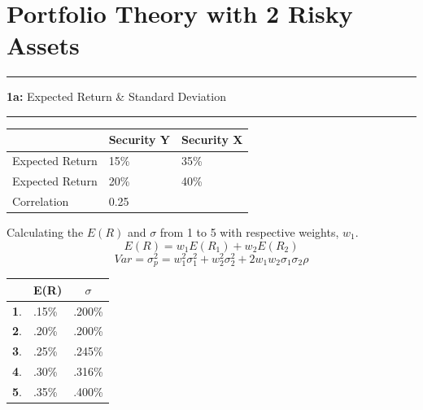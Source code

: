 \documentclass[11pt]{article}
\newcommand\question[2]{\vspace{.25in}\hrule\textbf{#1: } #2\vspace{.5em}\hrule\vspace{.10in}}
\begin{document}
\raggedright
\newcommand\NAME{Ramel Tranquille}  %
\newcommand\ANDREWID{rt1734}     %
\newcommand\HWNUM{2}              %


\section{Portfolio Theory with 2 Risky Assets}
\question{1a}{Expected Return \& Standard Deviation} 

\begin{table}[h]
    \label{tab:}
    \begin{center}
        \begin{tabular}[c]{l|l|l}
            \hline
            \multicolumn{1}{c}{\textbf{  }} & 
            \multicolumn{1}{c}{\textbf{Security Y}} &
            \multicolumn{1}{c}{\textbf{Security X}} \\
            \hline
            Expected Return & 15\% & 35\% \\
            Expected Return & 20\% & 40\% \\
            Correlation & 0.25 \\
            
            \hline
        \end{tabular}
    \end{center}
\end{table}

Calculating the $E(R)$ and $\sigma$ from 1 to 5 with respective weights, $w_1$.\\ 
$$
    E(R) = w_1 E(R_1) + w_2 E(R_2)
$$
\[
    Var = \sigma^2_p = w^2_1 \sigma^2_1 + w^2_2 \sigma^2_2 + 2w_1w_2\sigma_1 \sigma_2 \rho
\]

\begin{table}[h]
    \begin{center}
        \begin{tabular}[c]{l|l|l}
            \hline
            \multicolumn{1}{c}{\textbf{  }} & 
            \multicolumn{1}{c}{\textbf{E(R)}} &
            \multicolumn{1}{c}{\textbf{$\sigma$}} \\
            \hline
            \textbf1. & .15\% & .200\% \\
            \textbf2. & .20\% & .200\% \\
            \textbf3. & .25\% & .245\% \\
            \textbf4. & .30\% & .316\% \\
            \textbf5. & .35\% & .400\% \\
            \hline
        \end{tabular}
    \end{center}
\end{table}
\end{document}

